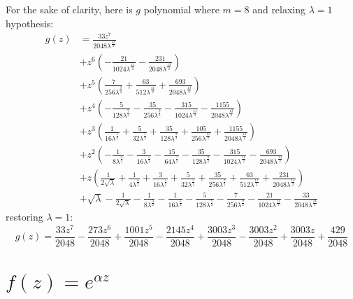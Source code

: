 For the sake of clarity, here is $g$ polynomial where $m=8$ and relaxing $\lambda=1$ hypothesis:
\begin{displaymath}
\begin{split}
g{\left (z \right )} &= \frac{33 z^{7}}{2048 \lambda^{\frac{13}{2}}} \\
&+ z^{6} \left(- \frac{21}{1024 \lambda^{\frac{11}{2}}} - \frac{231}{2048 \lambda^{\frac{13}{2}}}\right) \\
&+ z^{5} \left(\frac{7}{256 \lambda^{\frac{9}{2}}} + \frac{63}{512 \lambda^{\frac{11}{2}}} + \frac{693}{2048 \lambda^{\frac{13}{2}}}\right) \\
&+ z^{4} \left(- \frac{5}{128 \lambda^{\frac{7}{2}}} - \frac{35}{256 \lambda^{\frac{9}{2}}} - \frac{315}{1024 \lambda^{\frac{11}{2}}} - \frac{1155}{2048 \lambda^{\frac{13}{2}}}\right) \\
&+ z^{3} \left(\frac{1}{16 \lambda^{\frac{5}{2}}} + \frac{5}{32 \lambda^{\frac{7}{2}}} + \frac{35}{128 \lambda^{\frac{9}{2}}} + \frac{105}{256 \lambda^{\frac{11}{2}}} + \frac{1155}{2048 \lambda^{\frac{13}{2}}}\right) \\
&+ z^{2} \left(- \frac{1}{8 \lambda^{\frac{3}{2}}} - \frac{3}{16 \lambda^{\frac{5}{2}}} - \frac{15}{64 \lambda^{\frac{7}{2}}} - \frac{35}{128 \lambda^{\frac{9}{2}}} - \frac{315}{1024 \lambda^{\frac{11}{2}}} - \frac{693}{2048 \lambda^{\frac{13}{2}}}\right) \\
&+ z \left(\frac{1}{2 \sqrt{\lambda}} + \frac{1}{4 \lambda^{\frac{3}{2}}} + \frac{3}{16 \lambda^{\frac{5}{2}}} + \frac{5}{32 \lambda^{\frac{7}{2}}} + \frac{35}{256 \lambda^{\frac{9}{2}}} \right. + \left. \frac{63}{512 \lambda^{\frac{11}{2}}} + \frac{231}{2048 \lambda^{\frac{13}{2}}}\right) \\
&+ \sqrt{\lambda} - \frac{1}{2 \sqrt{\lambda}} - \frac{1}{8 \lambda^{\frac{3}{2}}} - \frac{1}{16 \lambda^{\frac{5}{2}}} - \frac{5}{128 \lambda^{\frac{7}{2}}} - \frac{7}{256 \lambda^{\frac{9}{2}}} - \frac{21}{1024 \lambda^{\frac{11}{2}}} - \frac{33}{2048 \lambda^{\frac{13}{2}}}
\end{split}
\end{displaymath}
restoring $\lambda=1$:
\begin{displaymath}
g{\left (z \right )} = \frac{33 z^{7}}{2048} - \frac{273 z^{6}}{2048} + \frac{1001 z^{5}}{2048} - \frac{2145 z^{4}}{2048} + \frac{3003 z^{3}}{2048} - \frac{3003 z^{2}}{2048} + \frac{3003 z}{2048} + \frac{429}{2048}
\end{displaymath}

\section{$f(z)=e^{\alpha z}$}

